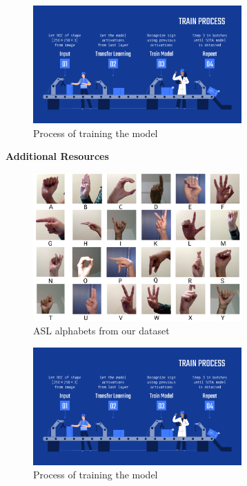 \documentclass[twocolumn]{article}
\begin{document}
\begin{figure}[h]
\centering
\includegraphics[width=8cm]{./figures/train process}
\caption{Process of training the model}
\end{figure}





\listoffigures
\listoftables

\glsaddall
\setlength{\glsdescwidth}{0.8\textwidth}
\printglossary[type=\acronymtype,title=List Of Abbreviations]

\clearpage
\LARGE{\textbf{Additional Resources}}

\begin{figure}[h]
\centering
\includegraphics[width=8cm]{./figures/alphabets}
\caption{ASL alphabets from our dataset}
\end{figure}

\begin{figure}[h]
\centering
\includegraphics[width=8cm]{./figures/train process}
\caption{Process of training the model}
\end{figure}
\end{document}
